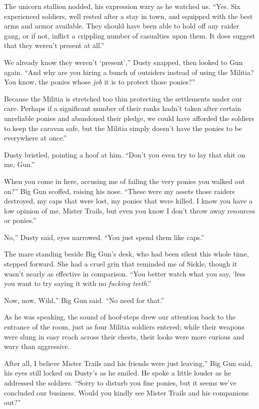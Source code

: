 The unicorn stallion nodded, his expression wary as he watched us. “Yes. Six experienced soldiers, well rested after a stay in town, and equipped with the best arms and armor available. They should have been able to hold off any raider gang, or if not, inflict a crippling number of casualties upon them. It does suggest that they weren’t present at all.”

\leavevmode{}We already know they weren’t ‘present’,” Dusty snapped, then looked to Gun again. “And why are you hiring a bunch of outsiders instead of using the Militia? You know, the ponies whose \textit{job} it is to protect those ponies?”

\leavevmode{}Because the Militia is stretched too thin protecting the settlements under our care. Perhaps if a significant number of their ranks hadn’t taken after certain unreliable ponies and abandoned their pledge, we could have afforded the soldiers to keep the caravan safe, but the Militia simply doesn’t have the ponies to be everywhere at once.”

Dusty bristled, pointing a hoof at him. “Don’t you even try to lay that shit on me, Gun.”

\leavevmode{}When you come in here, accusing me of failing the very ponies you walked out on?” Big Gun scoffed, raising his nose. “These were my assets those raiders destroyed, my caps that were lost, my ponies that were killed. I know you have a low opinion of me, Mister Trails, but even you know I don’t throw away resources or ponies.”

\leavevmode{}No,” Dusty said, eyes narrowed. “You just spend them like caps.”

The mare standing beside Big Gun’s desk, who had been silent this whole time, stepped forward. She had a cruel grin that reminded me of Sickle, though it wasn’t nearly as effective in comparison. “You better watch what you say, ‘less you want to try saying it with no \textit{fucking teeth}.”

\leavevmode{}Now, now, Wild,” Big Gun said. “No need for that.”

As he was speaking, the sound of hoof-steps drew our attention back to the entrance of the room, just as four Militia soldiers entered; while their weapons were slung in easy reach across their chests, their looks were more curious and wary than aggressive.

\leavevmode{}After all, I believe Mister Trails and his friends were just leaving,” Big Gun said, his eyes still locked on Dusty’s as he smiled. He spoke a little louder as he addressed the soldiers. “Sorry to disturb you fine ponies, but it seems we’ve concluded our business. Would you kindly see Mister Trails and his companions out?”

